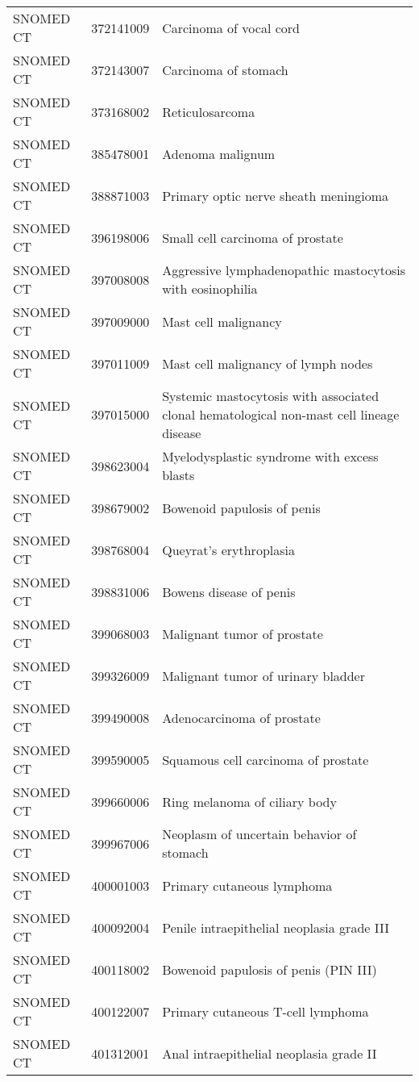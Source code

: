\begin{longtable}{p{}p{}p{}}
  SNOMED CT & 372141009 & Carcinoma of vocal cord \\ 
  SNOMED CT & 372143007 & Carcinoma of stomach \\ 
  SNOMED CT & 373168002 & Reticulosarcoma \\ 
  SNOMED CT & 385478001 & Adenoma malignum \\ 
  SNOMED CT & 388871003 & Primary optic nerve sheath meningioma \\ 
  SNOMED CT & 396198006 & Small cell carcinoma of prostate \\ 
  SNOMED CT & 397008008 & Aggressive lymphadenopathic mastocytosis with eosinophilia \\ 
  SNOMED CT & 397009000 & Mast cell malignancy \\ 
  SNOMED CT & 397011009 & Mast cell malignancy of lymph nodes \\ 
  SNOMED CT & 397015000 & Systemic mastocytosis with associated clonal hematological non-mast cell lineage disease \\ 
  SNOMED CT & 398623004 & Myelodysplastic syndrome with excess blasts \\ 
  SNOMED CT & 398679002 & Bowenoid papulosis of penis \\ 
  SNOMED CT & 398768004 & Queyrat's erythroplasia \\ 
  SNOMED CT & 398831006 & Bowens disease of penis \\ 
  SNOMED CT & 399068003 & Malignant tumor of prostate \\ 
  SNOMED CT & 399326009 & Malignant tumor of urinary bladder \\ 
  SNOMED CT & 399490008 & Adenocarcinoma of prostate \\ 
  SNOMED CT & 399590005 & Squamous cell carcinoma of prostate \\ 
  SNOMED CT & 399660006 & Ring melanoma of ciliary body \\ 
  SNOMED CT & 399967006 & Neoplasm of uncertain behavior of stomach \\ 
  SNOMED CT & 400001003 & Primary cutaneous lymphoma \\ 
  SNOMED CT & 400092004 & Penile intraepithelial neoplasia grade III \\ 
  SNOMED CT & 400118002 & Bowenoid papulosis of penis (PIN III) \\ 
  SNOMED CT & 400122007 & Primary cutaneous T-cell lymphoma \\ 
  SNOMED CT & 401312001 & Anal intraepithelial neoplasia grade II \\ 

\end{longtable}
